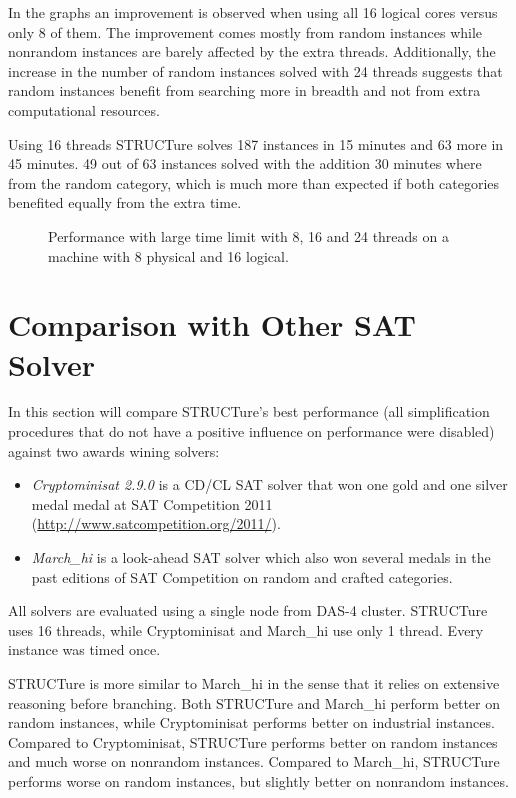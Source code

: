 In the graphs an improvement is observed when using all 16 logical
cores versus only 8 of them. The improvement comes mostly from
random instances while nonrandom instances are barely affected
by the extra threads.  Additionally, the increase in the number
of random instances solved with 24 threads suggests that random
instances benefit from searching more in breadth and not from extra
computational resources.

Using 16 threads STRUCTure solves 187 instances in 15 minutes and 63
more in 45 minutes. 49 out of 63 instances solved with the addition
30 minutes where from the random category, which is much more than
expected if both categories benefited equally from the extra time.

\begin{figure}
  \centering
  \caption{Performance with large time limit with 8, 16 and 24
  threads on a machine with 8 physical and 16 logical.}
  \label{fig:large}
\end{figure}


\section{Comparison with Other SAT Solver}
\label{sec:comparison}

In this section will compare STRUCTure's best performance (all
simplification procedures that do not have a positive influence on
performance were disabled) against two awards wining solvers:
\begin{itemize}
  \item \emph{Cryptominisat 2.9.0} \cite{mine:cryptominisat} is a
  CD/CL SAT solver that won one gold and one silver medal medal at
  SAT Competition 2011 (\url{http://www.satcompetition.org/2011/}).

  \item \emph{March\_hi} \cite{mine:march-hi} is a look-ahead SAT
  solver which also won several medals in the past editions of SAT
  Competition on random and crafted categories.
\end{itemize}

All solvers are evaluated using a single node from DAS-4 cluster.
STRUCTure uses 16 threads, while Cryptominisat and March\_hi
use only 1 thread. Every instance was timed once.

STRUCTure is more similar to March\_hi in the sense that it relies on
extensive reasoning before branching. Both STRUCTure and March\_hi
perform better on random instances, while Cryptominisat performs
better on industrial instances.  Compared to Cryptominisat, STRUCTure
performs better on random instances and much worse on nonrandom
instances. Compared to March\_hi, STRUCTure performs worse on
random instances, but slightly better on nonrandom instances.

